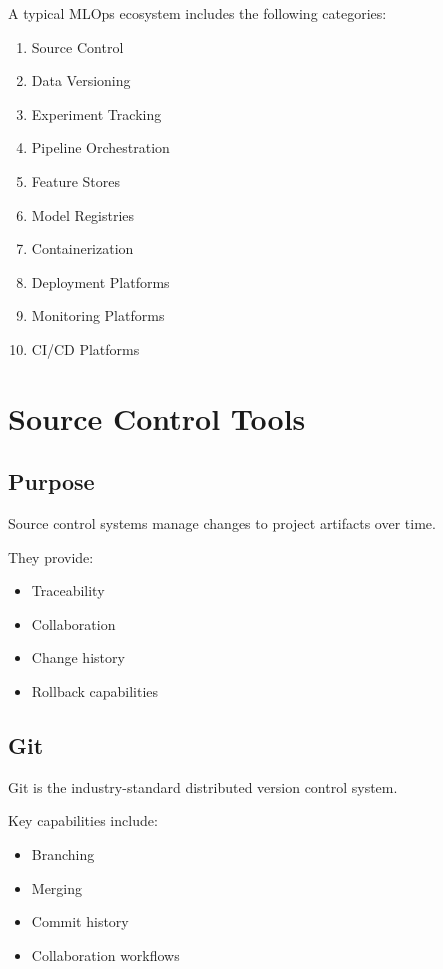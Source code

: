 A typical MLOps ecosystem includes the following categories:

\begin{enumerate}
    \item Source Control
    \item Data Versioning
    \item Experiment Tracking
    \item Pipeline Orchestration
    \item Feature Stores
    \item Model Registries
    \item Containerization
    \item Deployment Platforms
    \item Monitoring Platforms
    \item CI/CD Platforms
\end{enumerate}

\section{Source Control Tools}

\subsection{Purpose}

Source control systems manage changes to project artifacts over time.

They provide:

\begin{itemize}
    \item Traceability
    \item Collaboration
    \item Change history
    \item Rollback capabilities
\end{itemize}

\subsection{Git}

Git is the industry-standard distributed version control system.

Key capabilities include:

\begin{itemize}
    \item Branching
    \item Merging
    \item Commit history
    \item Collaboration workflows
\end{itemize}


